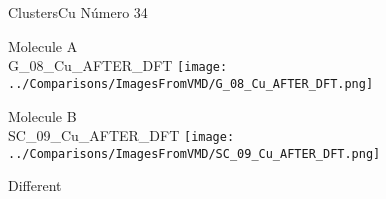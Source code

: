 \vtab[-3cm]
\begin{center}
{\large ClustersCu \tab Número 34}
\end{center}
\begin{multicols}{2}
\begin{center}
Molecule A \\ 
G\_08\_Cu\_AFTER\_DFT
\texttt{[image: ../Comparisons/ImagesFromVMD/G\_08\_Cu\_AFTER\_DFT.png]}
\\
\vtab

\columnbreak
Molecule B \\ 
SC\_09\_Cu\_AFTER\_DFT
\texttt{[image: ../Comparisons/ImagesFromVMD/SC\_09\_Cu\_AFTER\_DFT.png]}
\\
\vtab


\end{center}
\end{multicols}
\begin{center}
\textcolor{NavyBlue}{\Large Different}
\end{center}

 \newpage

